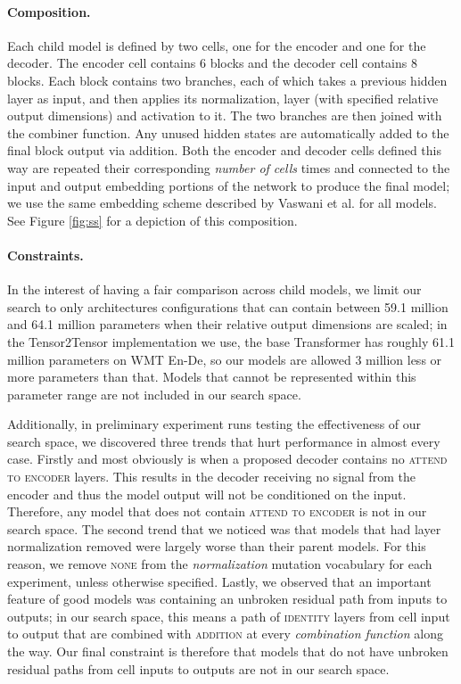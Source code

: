 \documentclass{article}
\begin{document}
\paragraph{Composition.}
Each child model is defined by two cells, one for the encoder and one for the decoder. The encoder cell contains 6 blocks and the decoder cell contains 8 blocks. Each block contains two branches, each of which takes a previous hidden layer as input, and then applies its normalization, layer (with specified relative output dimensions) and activation to it. The two branches are then joined with the combiner function. Any unused hidden states are automatically added to the final block output via addition. Both the encoder and decoder cells defined this way are repeated their corresponding \textit{number of cells} times and connected to the input and output embedding portions of the network to produce the final model; we use the same embedding scheme described by Vaswani et al.  for all models. See Figure \ref{fig:ss} for a depiction of this composition.

\paragraph{Constraints.}
In the interest of having a fair comparison across child models, we limit our search to only architectures configurations that can contain between 59.1 million and 64.1 million parameters when their relative output dimensions are scaled; in the Tensor2Tensor \cite{vaswani18} implementation we use, the base Transformer has roughly 61.1 million parameters on WMT En-De, so our models are allowed 3 million less or more parameters than that. Models that cannot be represented within this parameter range are not included in our search space.

Additionally, in preliminary experiment runs testing the effectiveness of our search space, we discovered three trends that hurt performance in almost every case. Firstly and most obviously is when a proposed decoder contains no \textsc{attend to encoder} layers. This results in the decoder receiving no signal from the encoder and thus the model output will not be conditioned on the input. Therefore, any model that does not contain \textsc{attend to encoder} is not in our search space. The second trend that we noticed was that models that had layer normalization removed were largely worse than their parent models. For this reason, we remove \textsc{none} from the \textit{normalization} mutation vocabulary for each experiment, unless otherwise specified. Lastly, we observed that an important feature of good models was containing an unbroken residual path from inputs to outputs; in our search space, this means a path of \textsc{identity} layers from cell input to output that are combined with \textsc{addition} at every \textit{combination function} along the way. Our final constraint is therefore that models that do not have unbroken residual paths from cell inputs to outputs are not in our search space.
\end{document}
